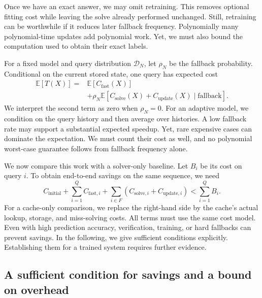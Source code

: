 \documentclass[11pt,a4paper]{article}
\numberwithin{equation}{section}
\newcommand{\E}{\mathbb{E}}
\theoremstyle{plain}
\theoremstyle{definition}
\theoremstyle{remark}
\begin{document}
Once we have an exact answer, we may omit retraining. This removes optional fitting cost while leaving the solve already performed unchanged. Still, retraining can be worthwhile if it reduces later fallback frequency. Polynomially many polynomial-time updates add polynomial work. Yet, we must also bound the computation used to obtain their exact labels.

For a fixed model and query distribution $\mathcal D_N$, let $\rho_N$ be the fallback probability. Conditional on the current stored state, one query has expected cost
\begin{equation}
\begin{split}
\E[T(X)]={}&\E[C_{\mathrm{fast}}(X)]\\
&+\rho_N\E\!\left[
C_{\mathrm{solve}}(X)+C_{\mathrm{update}}(X)
\mid\text{fallback}\right].
\end{split}
\label{eq:expected}
\end{equation}
We interpret the second term as zero when $\rho_N=0$. For an adaptive model, we condition on the query history and then average over histories. A low fallback rate may support a substantial expected speedup. Yet, rare expensive cases can dominate the expectation. We must count their cost as well, and no polynomial worst-case guarantee follows from fallback frequency alone.

We now compare this work with a solver-only baseline. Let $B_i$ be its cost on query $i$. To obtain end-to-end savings on the same sequence, we need
\begin{equation}
C_{\mathrm{initial}}+\sum_{i=1}^{Q}C_{\mathrm{fast},i}
+\sum_{i\in F}(C_{\mathrm{solve},i}+C_{\mathrm{update},i})
<\sum_{i=1}^{Q}B_i.
\label{eq:break-even}
\end{equation}
For a cache-only comparison, we replace the right-hand side by the cache's actual lookup, storage, and miss-solving costs. All terms must use the same cost model. Even with high prediction accuracy, verification, training, or hard fallbacks can prevent savings. In the following, we give sufficient conditions explicitly. Establishing them for a trained system requires further evidence.

\subsection{A sufficient condition for savings and a bound on overhead}
\end{document}

